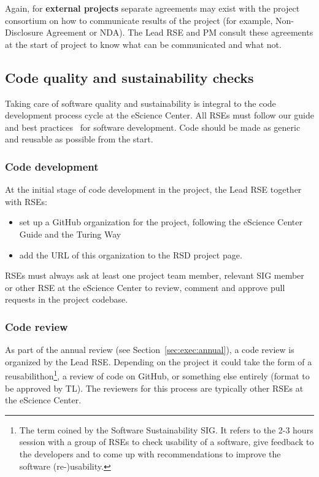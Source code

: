 Again, for \textbf{external projects} separate agreements may exist with the project consortium on how to communicate
results of the project (for example, Non-Disclosure Agreement or NDA). The Lead RSE and PM consult these agreements at
the start of project to know what can be communicated and what not.

\subsection{Code quality and sustainability checks}
Taking care of software quality and sustainability is integral to the code development process cycle at the eScience
Center. All RSEs must follow our guide and best practices~\cite{guide-nlesc} for software development. Code should be made
as generic and reusable as possible from the start.

\subsubsection{Code development}
\label{sec:exec:code}
At the initial stage of code development in the project, the Lead RSE together with RSEs:

\begin{itemize}
\item set up a GitHub organization for the project, following the eScience Center Guide and the Turing Way~\cite{the_turing_way-2023}
\item add the URL of this organization to the RSD project page.
\end{itemize}

RSEs must always ask at least one project team member, relevant SIG member or other RSE at the eScience Center to
review, comment and approve pull requests in the project codebase.

\subsubsection{Code review}
As part of the annual review (see Section~\ref{sec:exec:annual}), a code review is organized by the Lead RSE. Depending
on the project it could take the form of a reusabilithon\footnote{The term coined by the Software Sustainability SIG.
It refers to the 2-3 hours session with a group of RSEs to check usability of a software, give feedback to the
developers and to come up with recommendations to improve the software (re-)usability.}, a review of code on GitHub, or
something else entirely (format to be approved by TL). The reviewers for this process are typically other RSEs at the
eScience Center.


